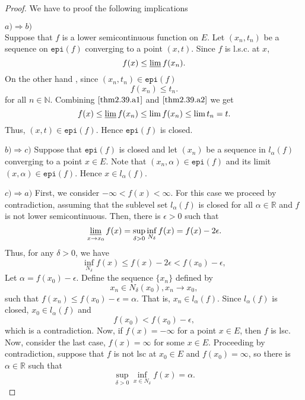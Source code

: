     \begin{proof}
    We have to proof the following implications 
    
    \textbf{$a) \Rightarrow b)$} \\
        Suppose that $f$ is a lower semicontinuous function on $E$. Let 
        $(x_n, t_n)$ be a sequence on $\mathtt{epi}(f)$ converging to a point 
        $(x,t)$. Since $f$ is l.s.c. at $x$,
        \begin{equation}\label{thm2.39.a1}
            f(x) \leq \varliminf f(x_n).
        \end{equation}
        On the other hand , since $(x_n, t_n) \in \mathtt{epi}(f)$ 
        \begin{equation}\label{thm2.39.a2}
            f(x_n) \leq t_n.
        \end{equation}
        for all $n \in \mathbb{N}$. Combining $\eqref{thm2.39.a1}$ and
        $\eqref{thm2.39.a2}$ we get 
        $$
            f(x) \leq \varliminf f(x_n) \leq \lim f(x_n) \leq \lim t_n = t.
        $$
        Thus, $(x,t) \in \mathtt{epi}(f)$. Hence $\mathtt{epi}(f)$ is closed.
        
    \textbf{$b) \Rightarrow c)$}
        Suppose that $\mathtt{epi}(f)$ is closed and let $(x_n)$ be a sequence 
        in
        $l_{\alpha}(f)$ converging to a point $x \in E$. Note that 
        $(x_n, \alpha) \in \mathtt{epi}(f)$ and its limit $(x, \alpha) \in 
        \mathtt{epi}(f)$. Hence $x \in l_{\alpha}(f)$.
        
    \textbf{$c) \Rightarrow a)$}
        First, we consider $-\infty < f(x) < \infty$. For this case we proceed 
        by
        contradiction, assuming that the sublevel set $l_{\alpha}(f)$  
        is closed for all $\alpha \in \mathbb{R}$ and $f$ is not lower 
        semicontinuous.
        Then, there is $\epsilon > 0$ such that
        $$
            \varliminf_{x \to x_0} f(x) = \sup_{\delta >0} \inf_{N_{\delta}} 
            f(x)
            = f(x) - 2\epsilon.
        $$
        Thus, for any $\delta > 0$, we have 
        $$
            \inf_{N_\delta} f(x) \leq f(x) - 2\epsilon < f(x_0) - \epsilon,
        $$
        Let $\alpha = f(x_0) - \epsilon$. Define the sequence $\{x_n\}$ defined
        by 
        $$
            x_n \in N_{\delta}(x_0), x_n \to x_0,
        $$
        such that $f(x_n) \leq f(x_0) - \epsilon = \alpha $. That is, 
        $x_n \in l_{\alpha}(f)$. Since $l_{\alpha}(f)$ is closed, 
        $x_0 \in l_{\alpha}(f)$ and 
        $$
            f(x_0) < f(x_0) - \epsilon,
        $$
        which is a contradiction. Now, if $f(x) = -\infty$ for a point $x \in 
        E$, then
        $f$ is lsc. Now, consider the last case, $f(x) = \infty$ for some $x 
        \in E$. 
        Proceeding by contradiction, suppose that $f$ is not lsc at $x_0 \in E$ 
        and
        $f(x_0) = \infty$, so 
        there is $\alpha \in \mathbb{R}$ such that
        $$
            \sup_{\delta > 0} \inf_{x \in N_{\delta}} f(x) = \alpha.
        $$
        

\end{proof}
